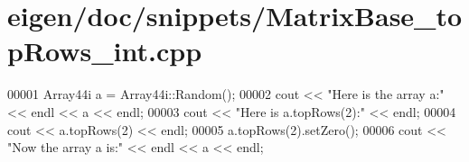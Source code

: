 \hypertarget{eigen_2doc_2snippets_2_matrix_base__top_rows__int_8cpp_source}{}\section{eigen/doc/snippets/\+Matrix\+Base\+\_\+top\+Rows\+\_\+int.cpp}
\label{eigen_2doc_2snippets_2_matrix_base__top_rows__int_8cpp_source}

\begin{DoxyCode}
00001 Array44i a = Array44i::Random();
00002 cout << \textcolor{stringliteral}{"Here is the array a:"} << endl << a << endl;
00003 cout << \textcolor{stringliteral}{"Here is a.topRows(2):"} << endl;
00004 cout << a.topRows(2) << endl;
00005 a.topRows(2).setZero();
00006 cout << \textcolor{stringliteral}{"Now the array a is:"} << endl << a << endl;
\end{DoxyCode}
